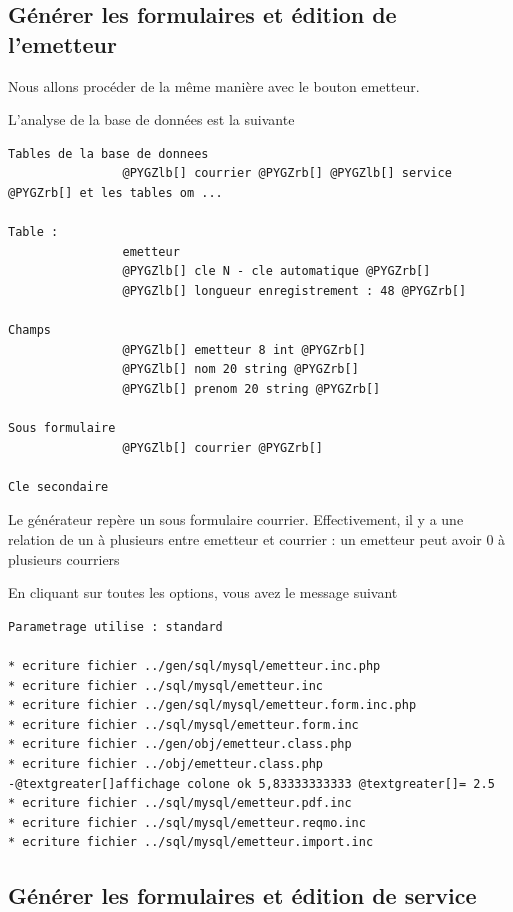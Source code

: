\documentclass[letterpaper,10pt,french]{manual}
\begin{document}
\subsection{Générer les formulaires et édition de l'emetteur}

Nous allons procéder de la même manière avec le bouton emetteur.

L'analyse de la base de données est la suivante

\begin{Verbatim}[commandchars=@\[\]]
Tables de la base de donnees
                @PYGZlb[] courrier @PYGZrb[] @PYGZlb[] service @PYGZrb[] et les tables om ...

Table :
                emetteur
                @PYGZlb[] cle N - cle automatique @PYGZrb[]
                @PYGZlb[] longueur enregistrement : 48 @PYGZrb[]

Champs
                @PYGZlb[] emetteur 8 int @PYGZrb[]
                @PYGZlb[] nom 20 string @PYGZrb[]
                @PYGZlb[] prenom 20 string @PYGZrb[]

Sous formulaire
                @PYGZlb[] courrier @PYGZrb[]

Cle secondaire
\end{Verbatim}

Le générateur repère un sous formulaire courrier.
Effectivement, il y a une relation de un à plusieurs entre emetteur et courrier :
un emetteur peut avoir 0 à plusieurs courriers

En cliquant sur toutes les options, vous avez le message suivant

\begin{Verbatim}[commandchars=@\[\]]
Parametrage utilise : standard

* ecriture fichier ../gen/sql/mysql/emetteur.inc.php
* ecriture fichier ../sql/mysql/emetteur.inc
* ecriture fichier ../gen/sql/mysql/emetteur.form.inc.php
* ecriture fichier ../sql/mysql/emetteur.form.inc
* ecriture fichier ../gen/obj/emetteur.class.php
* ecriture fichier ../obj/emetteur.class.php
-@textgreater[]affichage colone ok 5,83333333333 @textgreater[]= 2.5
* ecriture fichier ../sql/mysql/emetteur.pdf.inc
* ecriture fichier ../sql/mysql/emetteur.reqmo.inc
* ecriture fichier ../sql/mysql/emetteur.import.inc
\end{Verbatim}


\subsection{Générer les formulaires et édition de service}
\end{document}
